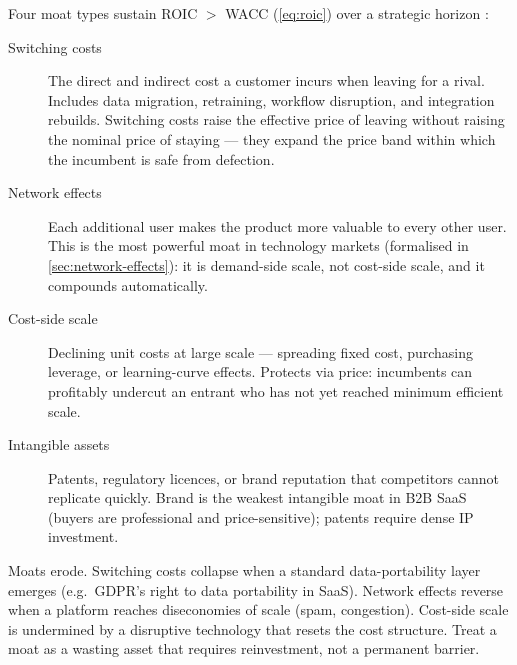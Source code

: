 Four moat types sustain ROIC $>$ WACC (\cref{eq:roic}) over a strategic horizon
\parencite{porter1985,dranove7theconomics}:
\begin{description}
  \item[Switching costs] The direct and indirect cost a customer incurs when leaving for a
        rival. Includes data migration, retraining, workflow disruption, and integration
        rebuilds. Switching costs raise the effective price of leaving without raising the
        nominal price of staying --- they expand the price band within which the incumbent
        is safe from defection.
  \item[Network effects] Each additional user makes the product more valuable to every
        other user. This is the most powerful moat in technology markets (formalised in
        \cref{sec:network-effects}): it is demand-side scale, not cost-side scale, and
        it compounds automatically.
  \item[Cost-side scale] Declining unit costs at large scale --- spreading fixed cost,
        purchasing leverage, or learning-curve effects. Protects via price: incumbents can
        profitably undercut an entrant who has not yet reached minimum efficient scale.
  \item[Intangible assets] Patents, regulatory licences, or brand reputation that
        competitors cannot replicate quickly. Brand is the weakest intangible moat in
        B2B SaaS (buyers are professional and price-sensitive); patents require dense
        IP investment.
\end{description}

Moats erode. Switching costs collapse when a standard data-portability layer emerges (e.g.\
GDPR's right to data portability in SaaS). Network effects reverse when a platform reaches
diseconomies of scale (spam, congestion). Cost-side scale is undermined by a disruptive
technology that resets the cost structure. Treat a moat as a wasting asset that requires
reinvestment, not a permanent barrier.

